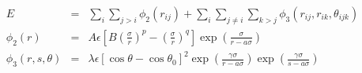 \documentclass[12pt]{article}
\begin{document}
\begin{eqnarray*}
  E & = & \sum_i \sum_{j > i} \phi_2 (r_{ij}) + 
          \sum_i \sum_{j \neq i} \sum_{k > j} 
          \phi_3 (r_{ij}, r_{ik}, \theta_{ijk}) \\
  \phi_2(r) & = & A \epsilon \left[ B (\frac{\sigma}{r})^p - 
                    (\frac{\sigma}{r})^q \right] 
                    \exp \left( \frac{\sigma}{r - a \sigma} \right) \\
  \phi_3(r,s,\theta) & = & \lambda \epsilon \left[ \cos \theta - 
                    \cos \theta_0 \right]^2
                    \exp \left( \frac{\gamma \sigma}{r - a \sigma} \right)
                    \exp \left( \frac{\gamma \sigma}{s - a \sigma} \right)
\end{eqnarray*}                           
\end{document}
